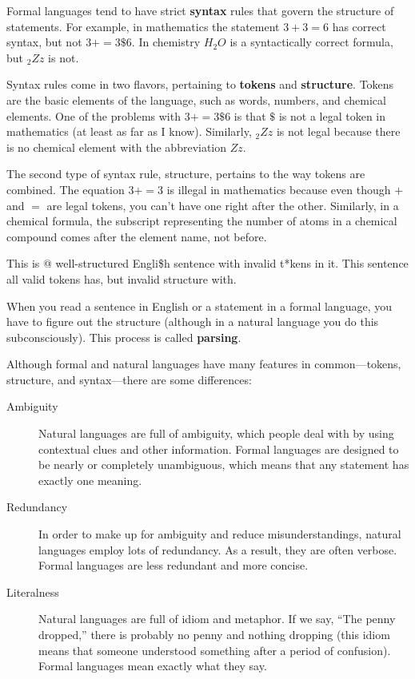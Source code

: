 Formal languages tend to have strict {\bf syntax} rules that
govern the structure of statements.
For example, in mathematics the statement
$3 + 3 = 6$ has correct syntax, but
not $3 + = 3 \$ 6$.  In chemistry
$H_2O$ is a syntactically correct formula, but $_2Zz$ is not.

Syntax rules come in two flavors, pertaining to {\bf tokens} and
{\bf structure}.  Tokens are the basic elements of the language, such as
words, numbers, and chemical elements.  One of the problems with
$3 += 3 \$ 6$ is that \( \$ \) is not a legal token in mathematics
(at least as far as I know).  Similarly, $_2Zz$ is not legal because
there is no chemical element with the abbreviation $Zz$.

The second type of syntax rule, structure, pertains to the way tokens are
combined.  The equation $3 += 3$ is illegal in mathematics 
because even though $+$ and $=$ are legal tokens, you can't 
have one right after the other. Similarly, in a chemical formula, 
the subscript representing the number of atoms in a 
chemical compound comes after the element name, not before.

This is @ well-structured Engli\$h
sentence with invalid t*kens in it.  This sentence all valid 
tokens has, but invalid structure with.

When you read a sentence in English or a statement in a formal
language, you have to figure out the structure
(although in a natural language you do this subconsciously).  This
process is called {\bf parsing}.

Although formal and natural languages have many features in
common---tokens, structure, and syntax---there are some
differences:

\begin{description}

\item[Ambiguity] Natural languages are full of ambiguity, which
people deal with by using contextual clues and other information.
Formal languages are designed to be nearly or completely unambiguous,
which means that any statement has exactly one meaning. 

\item[Redundancy] In order to make up for ambiguity and reduce
misunderstandings, natural languages employ lots of
redundancy.  As a result, they are often verbose.  Formal languages
are less redundant and more concise.

\item[Literalness] Natural languages are full of idiom and metaphor.
If we say, ``The penny dropped,'' there is probably no penny and
nothing dropping (this idiom means that someone understood something
after a period of confusion).  Formal languages
mean exactly what they say.

\end{description}

